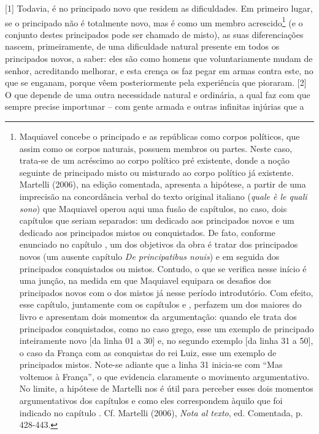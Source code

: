 {[}1{]} Todavia, é no principado novo que residem as dificuldades. Em
primeiro lugar, se o principado não é totalmente novo, mas é como um
membro acrescido\footnote{Maquiavel concebe o principado e as repúblicas
  como corpos políticos, que assim como os corpos naturais, possuem
  membros ou partes. Neste caso, trata-se de um acréscimo ao corpo
  político pré existente, donde a noção seguinte de principado misto ou
  misturado ao corpo político já existente. Martelli (2006), na edição
  comentada, apresenta a hipótese, a partir de uma imprecisão na
  concordância verbal do texto original italiano (\emph{quale è le quali
  sono}) que Maquiavel operou aqui uma fusão de capítulos, no caso, dois
  capítulos que seriam separados: um dedicado aos principados novos e um
  dedicado aos principados mistos ou conquistados. De fato, conforme
  enunciado no capítulo , um dos objetivos da obra é tratar dos
  principados novos (um ausente capítulo \emph{De principatibus nouis})
  e em seguida dos principados conquistados ou mistos. Contudo, o que se
  verifica nesse início é uma junção, na medida em que Maquiavel
  equipara os desafios dos principados novos com o dos mistos já nesse
  período introdutório. Com efeito, esse capítulo, juntamente com os
  capítulos  e , perfazem um dos maiores do livro e apresentam
  dois momentos da argumentação: quando ele trata dos principados
  conquistados, como no caso grego, esse um exemplo de principado
  inteiramente novo {[}da linha 01 a 30{]} e, no segundo exemplo {[}da
  linha 31 a 50{]}, o caso da França com as conquistas do rei Luiz, esse
  um exemplo de principados mistos. Note-se adiante que a linha 31
  inicia-se com ``Mas voltemos à França'', o que evidencia claramente o
  movimento argumentativo. No limite, a hipótese de Martelli nos é útil
  para perceber esses dois momentos argumentativos dos capítulos e como
  eles correspondem àquilo que foi indicado no capítulo . Cf. Martelli
  (2006), \emph{Nota al texto}, ed. Comentada, p. 428-443.} (e o
conjunto destes principados pode ser chamado de misto), as suas
diferenciações nascem, primeiramente, de uma dificuldade natural
presente em todos os principados novos, a saber: eles são como homens
que voluntariamente mudam de senhor, acreditando melhorar, e esta crença
os faz pegar em armas contra este, no que se enganam, porque vêem
posteriormente pela experiência que pioraram. {[}2{]} O que depende de
uma outra necessidade natural e ordinária, a qual faz com que sempre
precise importunar -- com gente armada e outras infinitas injúrias que a
